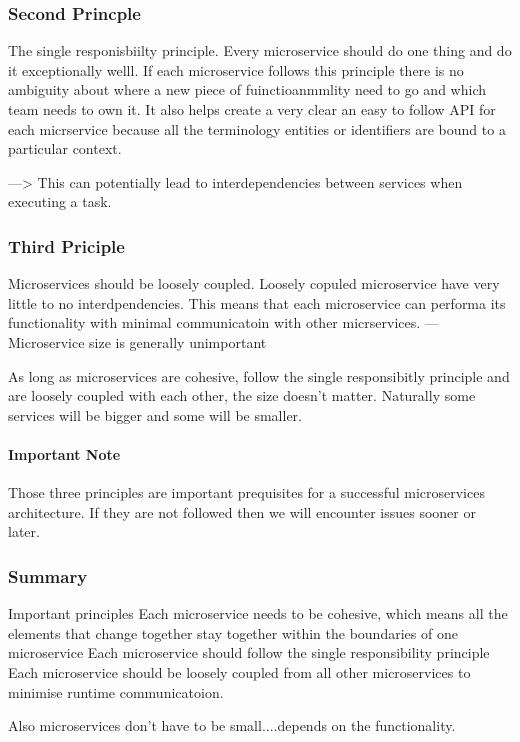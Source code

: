 \documentclass[a4paper, 11pt]{book}
\begin{document}
{    \subsubsection{Second Princple}
    The single responisbiilty principle.
    Every microservice should do one thing and do it exceptionally welll.
    If each microservice follows this principle there is no ambiguity about where a new piece of fuinctioanmmlity need to go and which team needs to own it.
    It also helps create a very clear an easy to follow API for each micrservice because all the terminology entities or identifiers are bound to a particular context.

    ---> This can potentially lead to interdependencies between services when executing a task.

    \subsubsection{Third Priciple}
    Microservices should be loosely coupled.
    Loosely copuled microservice have very little to no interdpendencies.
    This means that each microservice can performa its functionality with minimal communicatoin with other micrservices.
    --- Microservice size is generally unimportant

    As long as microservices are cohesive, follow the single responsibitly principle and are loosely coupled with each other, the size doesn't matter.
    Naturally some services will be bigger and some will be smaller.

    \paragraph{Important Note}
    Those three principles are important prequisites for a successful microservices architecture.
    If they are not followed then we will encounter issues sooner or later.

    \subsubsection{Summary}
    Important principles
    Each microservice needs to be cohesive, which means all the elements that change together stay together within the boundaries of one microservice
    Each microservice should follow the single responsibility principle
    Each microservice should be loosely coupled from all other microservices to minimise runtime communicatoion.

    Also microservices don't have to be small....depends on the functionality.

}
\end{document}
